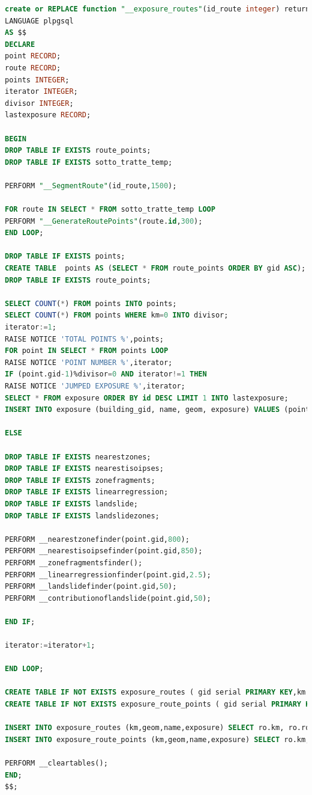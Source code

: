 \begin{lstlisting}[language=SQL]
create or REPLACE function "__exposure_routes"(id_route integer) returns void
LANGUAGE plpgsql
AS $$
DECLARE
point RECORD;
route RECORD;
points INTEGER;
iterator INTEGER;
divisor INTEGER;
lastexposure RECORD;

BEGIN
DROP TABLE IF EXISTS route_points;
DROP TABLE IF EXISTS sotto_tratte_temp;

PERFORM "__SegmentRoute"(id_route,1500);

FOR route IN SELECT * FROM sotto_tratte_temp LOOP
PERFORM "__GenerateRoutePoints"(route.id,300);
END LOOP;

DROP TABLE IF EXISTS points;
CREATE TABLE  points AS (SELECT * FROM route_points ORDER BY gid ASC);
DROP TABLE IF EXISTS route_points;

SELECT COUNT(*) FROM points INTO points;
SELECT COUNT(*) FROM points WHERE km=0 INTO divisor;
iterator:=1;
RAISE NOTICE 'TOTAL POINTS %',points;
FOR point IN SELECT * FROM points LOOP
RAISE NOTICE 'POINT NUMBER %',iterator;
IF (point.gid-1)%divisor=0 AND iterator!=1 THEN
RAISE NOTICE 'JUMPED EXPOSURE %',iterator;
SELECT * FROM exposure ORDER BY id DESC LIMIT 1 INTO lastexposure;
INSERT INTO exposure (building_gid, name, geom, exposure) VALUES (point.gid, point.name, point.geom, lastexposure.exposure);

ELSE

DROP TABLE IF EXISTS nearestzones;
DROP TABLE IF EXISTS nearestisoipses;
DROP TABLE IF EXISTS zonefragments;
DROP TABLE IF EXISTS linearregression;
DROP TABLE IF EXISTS landslide;
DROP TABLE IF EXISTS landslidezones;

PERFORM __nearestzonefinder(point.gid,800);
PERFORM __nearestisoipsefinder(point.gid,850);
PERFORM __zonefragmentsfinder();
PERFORM __linearregressionfinder(point.gid,2.5);
PERFORM __landslidefinder(point.gid,50);
PERFORM __contributionoflandslide(point.gid,50);

END IF;

iterator:=iterator+1;

END LOOP;

CREATE TABLE IF NOT EXISTS exposure_routes ( gid serial PRIMARY KEY,km INTEGER, geom Geometry, name varchar,exposure FLOAT);
CREATE TABLE IF NOT EXISTS exposure_route_points ( gid serial PRIMARY KEY,km INTEGER, geom Geometry, name varchar,exposure FLOAT);

INSERT INTO exposure_routes (km,geom,name,exposure) SELECT ro.km, ro.routegeom, exposure.name,SUM (exposure.exposure) as exposure FROM exposure INNER JOIN points as ro ON exposure.building_gid=ro.gid GROUP BY exposure.name , ro.routegeom, ro.km;
INSERT INTO exposure_route_points (km,geom,name,exposure) SELECT ro.km, ro.geom, exposure.name,exposure.exposure FROM exposure INNER JOIN points as ro ON exposure.building_gid=ro.gid;

PERFORM __cleartables();
END;
$$;
\end{lstlisting}


